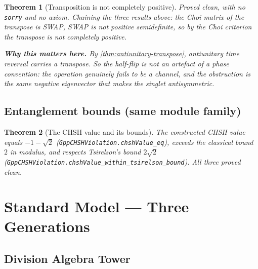 \documentclass{report}
\newtheorem{theorem}{Theorem}[chapter]
\theoremstyle{definition}
\begin{document}
\begin{theorem}[Transposition is not completely positive]
  \label{thm:transpose-not-cp}
  \leanok
  \emph{Proved clean}, with no \texttt{sorry} and no axiom. Chaining the three results
  above: the Choi matrix of the transpose is SWAP, SWAP is not positive semidefinite, so
  by the Choi criterion the transpose is not completely positive.

  \textbf{Why this matters here.} By \ref{thm:antiunitary-transpose}, antiunitary time
  reversal carries a transpose. So the half-flip is not an artefact of a phase
  convention: the operation genuinely fails to be a channel, and the obstruction is the
  same negative eigenvector that makes the singlet antisymmetric.
\end{theorem}

\section{Entanglement bounds (same module family)}

\begin{theorem}[The CHSH value and its bounds]
  \label{thm:chsh}
  \leanok
  The constructed CHSH value equals $-1-\sqrt2$
  (\texttt{GppCHSHViolation.chshValue\_eq}), exceeds the classical bound $2$ in modulus,
  and respects Tsirelson's bound $2\sqrt2$
  (\texttt{GppCHSHViolation.chshValue\_within\_tsirelson\_bound}). All three proved
  clean.
\end{theorem}

\chapter{Standard Model --- Three Generations}

\section{Division Algebra Tower}
\end{document}
